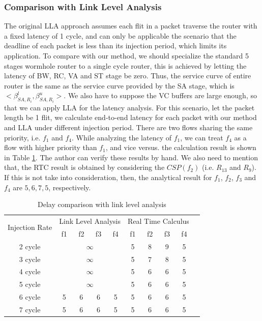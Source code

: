 \documentclass[10pt,journal]{IEEEtran}
\begin{document}
\subsubsection{Comparison with Link Level Analysis}
The original LLA approach assumes each flit in a packet traverse the router with a fixed latency of 1 cycle, and can only be applicable the scenario that the deadline of each packet is less than its injection period, which limits its application. To compare with our method, we should specialize the standard 5 stages wormhole router to a single cycle router, this is achieved by letting the latency of BW, RC, VA and ST stage be zero. Thus, the service curve of entire router is the same as the service curve provided by the SA stage, which is $<\beta_{SA,R_i}^l,\beta_{SA,R_i}^u>$. We also have to suppose the VC buffers are large enough, so that we can apply LLA for the latency analysis. For this scenario, let the packet length be 1 flit, we calculate end-to-end latency for each packet with our method and LLA under different injection period. There are two flows sharing the same priority, i.e. $f_1$ and $f_4$. While analyzing the latency of $f_1$, we can treat $f_4$ as a flow with higher priority than $f_1$, and vice versus. the calculation result is shown in Table \ref{LLAvsRTC}. The author can verify these results by hand. We also need to mention that, the RTC result is obtained by considering the $CSP(f_2)$ (i.e. $R_{13}$ and $R_{9}$). If this is not take into consideration, then, the analytical result for $f_1$, $f_2$, $f_3$ and $f_4$ are $5,6,7,5$, respectively.
\begin{table}[htbp]
\centering
\caption{\label{LLAvsRTC}Delay comparison with link level analysis}
\begin{tabular}{|c|c|c|c|c|c|c|c|c|c|}
\hline
\multirow{2}{*}{Injection Rate}  & \multicolumn{4}{|c|}{Link Level Analysis} & \multicolumn{4}{|c|}{Real Time Calculus} \\
\cline{2-9}
& f1 & f2 & f3 & f4 & f1 & f2 & f3 & f4\\
\hline\hline
2 cycle & \multicolumn{4}{|c|}{$\infty$} & 5 & 8 & 9 & 5\\
\hline
3 cycle & \multicolumn{4}{|c|}{$\infty$} & 5 & 7 & 8 & 5\\
\hline
4 cycle & \multicolumn{4}{|c|}{$\infty$} & 5 & 6 & 6 & 5\\
\hline
5 cycle & \multicolumn{4}{|c|}{$\infty$} & 5 & 6 & 6 & 5\\
\hline
6 cycle & 5 & 6 & 6 & 5 & 5 & 6 & 6 & 5\\
\hline
7 cycle & 5 & 6 & 6 & 5 & 5 & 6 & 6 & 5\\
\hline
\end{tabular}
\end{table}
\end{document}
